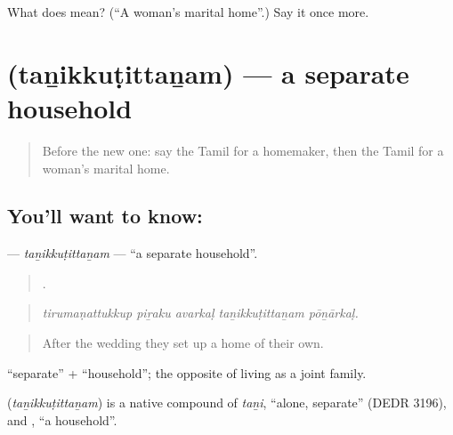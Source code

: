 \begin{tcolorbox}[breakable,colback=teal!4,colframe=teal!35!black,title={Before you move on}]
What does   mean? (\textquotedblleft{}A woman’s marital home\textquotedblright{}.) Say it once more.
\end{tcolorbox}
\section[\texorpdfstring{\ta{தனிக்குடித்தனம்} (taṉikkuṭittaṉam)}{தனிக்குடித்தனம் (taṉikkuṭittaṉam)}]{ (taṉikkuṭittaṉam) — a separate household}

\label{lesson:TA-C500-tanikkutittanam}



\begin{quote}
Before the new one: say the Tamil for a homemaker, then the Tamil for a woman’s marital home.
\end{quote}

\subsection*{You'll want to know: }
\textbf{} — \emph{taṉikkuṭittaṉam} — \textquotedblleft{}a separate household\textquotedblright{}.

\begin{quote}
    .
\end{quote}

\begin{quote}
\emph{tirumaṇattukkup piṟaku avarkaḷ taṉikkuṭittaṉam pōṉārkaḷ.}
\end{quote}

\begin{quote}
After the wedding they set up a home of their own.
\end{quote}

 \textquotedblleft{}separate\textquotedblright{} +  \textquotedblleft{}household\textquotedblright{}; the opposite of living as a joint family.

\begin{cousinweb}
\textbf{} (\emph{taṉikkuṭittaṉam}) is a native compound of  \emph{taṉi}, \textquotedblleft{}alone, separate\textquotedblright{} (DEDR 3196), and , \textquotedblleft{}a household\textquotedblright{}.
\end{cousinweb}

